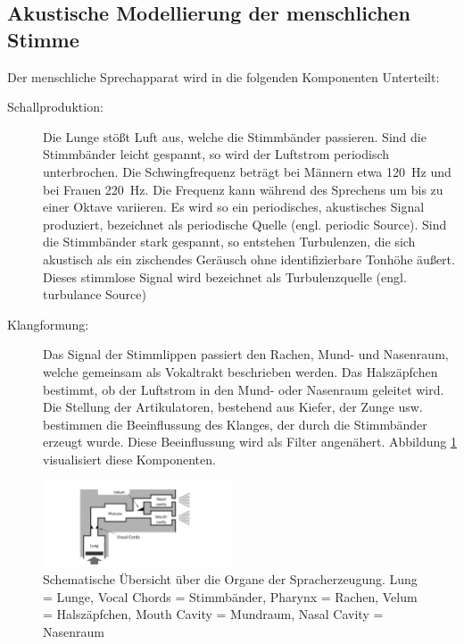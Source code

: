 \subsection{Akustische Modellierung der menschlichen Stimme}
\label{sec:theVoice}

Der menschliche Sprechapparat wird in die folgenden Komponenten Unterteilt:

\begin{description}

\item[Schallproduktion: ] Die Lunge stößt Luft aus, welche die Stimmbänder passieren. Sind die Stimmbänder leicht gespannt, so wird der Luftstrom periodisch unterbrochen. Die Schwingfrequenz beträgt bei Männern etwa \SI{120}{\hertz} und bei Frauen \SI{220}{\hertz}. Die Frequenz kann während des Sprechens um bis zu einer Oktave variieren. Es wird so ein periodisches, akustisches Signal produziert, bezeichnet als \glqq periodische Quelle\grqq{} (engl. \glqq periodic Source\grqq). Sind die Stimmbänder stark gespannt, so entstehen Turbulenzen, die sich akustisch als ein zischendes Geräusch ohne identifizierbare Tonhöhe äußert. Dieses stimmlose Signal wird bezeichnet als \glqq Turbulenzquelle\grqq{} (engl. \glqq turbulance Source\grqq)
\item[Klangformung: ] Das Signal der Stimmlippen passiert den Rachen, Mund- und Nasenraum, welche gemeinsam als \glqq Vokaltrakt\grqq{} beschrieben werden. Das Halszäpfchen bestimmt, ob der Luftstrom in den Mund- oder Nasenraum geleitet wird. Die Stellung der Artikulatoren, bestehend aus Kiefer, der Zunge usw. bestimmen die Beeinflussung des Klanges, der durch die Stimmbänder erzeugt wurde. Diese Beeinflussung wird als Filter angenähert. \cite[S. 62]{cryModel} \cite[S. 13]{sprachverarbeitung} Abbildung \ref{img:schematicVocalOrgans} visualisiert diese Komponenten.
\end{description}

\begin{figure}[h]
	\centering
	\includegraphics[width=0.5\textwidth]{bilder/SchematicVocalOrgans.png}
	\caption{Schematische Übersicht über die Organe der Spracherzeugung. Lung = Lunge, Vocal Chords = Stimmbänder, Pharynx = Rachen, Velum = Halszäpfchen, Mouth Cavity = Mundraum, Nasal Cavity = Nasenraum \cite{speechProduction}}
	\label{img:schematicVocalOrgans}
\end{figure}	

